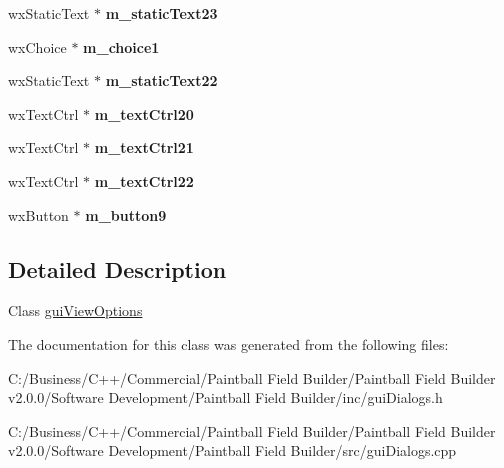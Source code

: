 \begin{DoxyCompactItemize}
\item 
\hypertarget{classgui_view_options_a6c7d5fd8195ea0e6e4a1eeb5b60cd2d5}{
wxStaticText $\ast$ {\bfseries m\_\-staticText23}}
\label{classgui_view_options_a6c7d5fd8195ea0e6e4a1eeb5b60cd2d5}

\item 
\hypertarget{classgui_view_options_a77168a13dfcd31477e935d7edfdc76cd}{
wxChoice $\ast$ {\bfseries m\_\-choice1}}
\label{classgui_view_options_a77168a13dfcd31477e935d7edfdc76cd}

\item 
\hypertarget{classgui_view_options_ade755b7b78d02c5018460bbdf45c76b1}{
wxStaticText $\ast$ {\bfseries m\_\-staticText22}}
\label{classgui_view_options_ade755b7b78d02c5018460bbdf45c76b1}

\item 
\hypertarget{classgui_view_options_aa614ee4b0774f88f8a01cbfe70a25d5d}{
wxTextCtrl $\ast$ {\bfseries m\_\-textCtrl20}}
\label{classgui_view_options_aa614ee4b0774f88f8a01cbfe70a25d5d}

\item 
\hypertarget{classgui_view_options_a8c94f01a465ed2cae004824e260a6980}{
wxTextCtrl $\ast$ {\bfseries m\_\-textCtrl21}}
\label{classgui_view_options_a8c94f01a465ed2cae004824e260a6980}

\item 
\hypertarget{classgui_view_options_a4000c908ab9655885c1e3ac9512f4122}{
wxTextCtrl $\ast$ {\bfseries m\_\-textCtrl22}}
\label{classgui_view_options_a4000c908ab9655885c1e3ac9512f4122}

\item 
\hypertarget{classgui_view_options_a5c01b36cdfd5ff4b2bac9fe55dc8aa06}{
wxButton $\ast$ {\bfseries m\_\-button9}}
\label{classgui_view_options_a5c01b36cdfd5ff4b2bac9fe55dc8aa06}

\end{DoxyCompactItemize}


\subsection{Detailed Description}
Class \hyperlink{classgui_view_options}{guiViewOptions} 

The documentation for this class was generated from the following files:\begin{DoxyCompactItemize}
\item 
C:/Business/C++/Commercial/Paintball Field Builder/Paintball Field Builder v2.0.0/Software Development/Paintball Field Builder/inc/guiDialogs.h\item 
C:/Business/C++/Commercial/Paintball Field Builder/Paintball Field Builder v2.0.0/Software Development/Paintball Field Builder/src/guiDialogs.cpp\end{DoxyCompactItemize}
